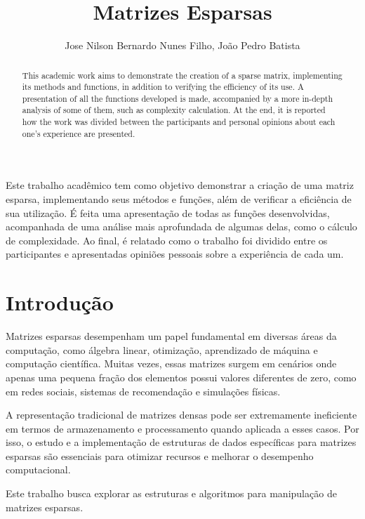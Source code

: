 \documentclass[12pt]{article}
\title{Matrizes Esparsas}
\author{Jose Nilson Bernardo Nunes Filho\inst{1}, João Pedro Batista\inst{1}}
\begin{document}
 

\maketitle

\begin{abstract}
  This academic work aims to demonstrate the creation of a sparse matrix, implementing its methods and functions, in addition to verifying the efficiency of its use. A presentation of all the functions developed is made, accompanied by a more in-depth analysis of some of them, such as complexity calculation.
At the end, it is reported how the work was divided between the participants and personal opinions about each one's experience are presented.
\end{abstract}
     
\begin{resumo} 
  Este trabalho acadêmico tem como objetivo demonstrar a criação de uma matriz esparsa, implementando seus métodos e funções, além de verificar a eficiência de sua utilização. É feita uma apresentação de todas as funções desenvolvidas, acompanhada de uma análise mais aprofundada de algumas delas, como o cálculo de complexidade.
Ao final, é relatado como o trabalho foi dividido entre os participantes e apresentadas opiniões pessoais sobre a experiência de cada um.
\end{resumo}

\section{Introdução}

Matrizes esparsas desempenham um papel fundamental em diversas áreas da computação, como álgebra linear, otimização, aprendizado de máquina e computação científica. Muitas vezes, essas matrizes surgem em cenários onde apenas uma pequena fração dos elementos possui valores diferentes de zero, como em redes sociais, sistemas de recomendação e simulações físicas.

A representação tradicional de matrizes densas pode ser extremamente ineficiente em termos de armazenamento e processamento quando aplicada a esses casos. Por isso, o estudo e a implementação de estruturas de dados específicas para matrizes esparsas são essenciais para otimizar recursos e melhorar o desempenho computacional.

Este trabalho busca explorar as estruturas e algoritmos para manipulação de matrizes esparsas.
\end{document}
